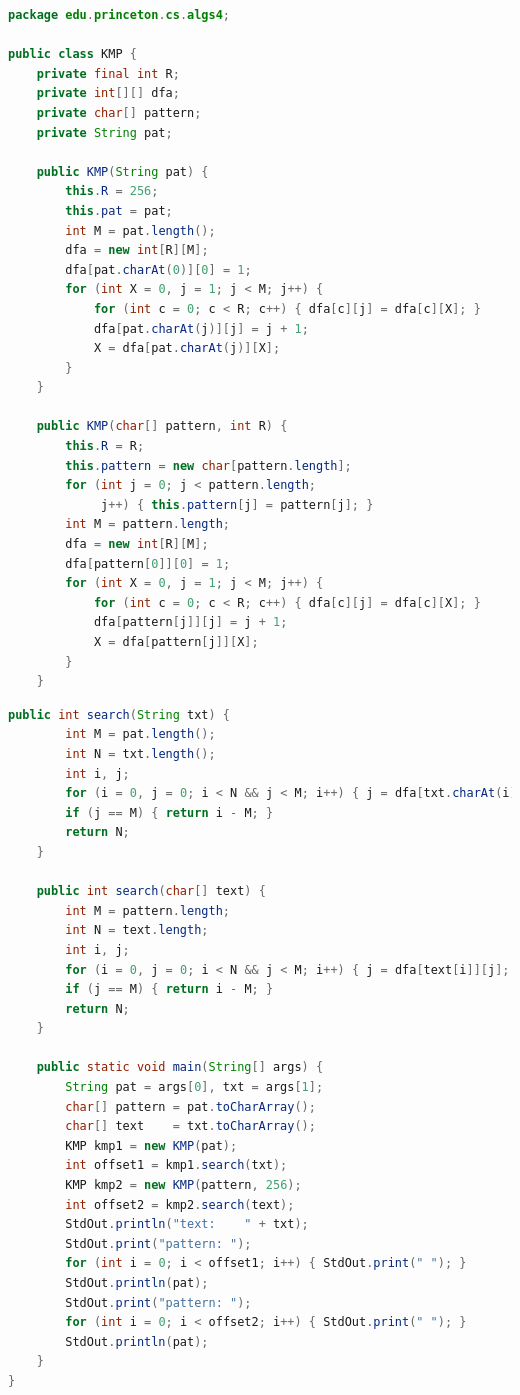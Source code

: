 \documentclass[8pt,a4paper,compress]{beamer}
\begin{document}
\begin{frame}[fragile]
\pause

\begin{lstlisting}[language=Java]
package edu.princeton.cs.algs4;

public class KMP {
    private final int R;
    private int[][] dfa;
    private char[] pattern;
    private String pat;

    public KMP(String pat) {
        this.R = 256;
        this.pat = pat;
        int M = pat.length();
        dfa = new int[R][M]; 
        dfa[pat.charAt(0)][0] = 1; 
        for (int X = 0, j = 1; j < M; j++) {
            for (int c = 0; c < R; c++) { dfa[c][j] = dfa[c][X]; }
            dfa[pat.charAt(j)][j] = j + 1;  
            X = dfa[pat.charAt(j)][X];  
        } 
    } 

    public KMP(char[] pattern, int R) {
        this.R = R;
        this.pattern = new char[pattern.length];
        for (int j = 0; j < pattern.length; 
             j++) { this.pattern[j] = pattern[j]; }
        int M = pattern.length;
        dfa = new int[R][M]; 
        dfa[pattern[0]][0] = 1; 
        for (int X = 0, j = 1; j < M; j++) {
            for (int c = 0; c < R; c++) { dfa[c][j] = dfa[c][X]; } 
            dfa[pattern[j]][j] = j + 1; 
            X = dfa[pattern[j]][X];
        } 
    } 
\end{lstlisting}
\end{frame}

\begin{frame}[fragile]
\pause

\begin{lstlisting}[language=Java]
    public int search(String txt) {
        int M = pat.length();
        int N = txt.length();
        int i, j;
        for (i = 0, j = 0; i < N && j < M; i++) { j = dfa[txt.charAt(i)][j]; }
        if (j == M) { return i - M; }
        return N; 
    }

    public int search(char[] text) {
        int M = pattern.length;
        int N = text.length;
        int i, j;
        for (i = 0, j = 0; i < N && j < M; i++) { j = dfa[text[i]][j]; }
        if (j == M) { return i - M; }
        return N;
    }

    public static void main(String[] args) {
        String pat = args[0], txt = args[1];
        char[] pattern = pat.toCharArray();
        char[] text    = txt.toCharArray();
        KMP kmp1 = new KMP(pat);
        int offset1 = kmp1.search(txt);
        KMP kmp2 = new KMP(pattern, 256);
        int offset2 = kmp2.search(text);
        StdOut.println("text:    " + txt);
        StdOut.print("pattern: ");
        for (int i = 0; i < offset1; i++) { StdOut.print(" "); }
        StdOut.println(pat);
        StdOut.print("pattern: ");
        for (int i = 0; i < offset2; i++) { StdOut.print(" "); }
        StdOut.println(pat);
    }
}
\end{lstlisting}
\end{frame}
\end{document}
